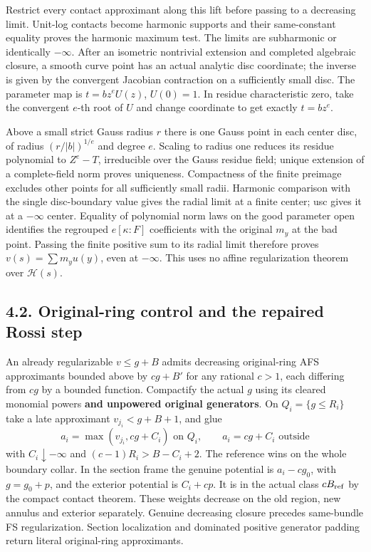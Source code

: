 \documentclass[
  10pt,
]{article}
\begin{document}
Restrict every contact approximant along this lift before passing to a
decreasing limit. Unit-log contacts become harmonic supports and their
same-constant equality proves the harmonic maximum test. The limits are
subharmonic or identically \(-\infty\). After an isometric nontrivial
extension and completed algebraic closure, a smooth curve point has an
actual analytic disc coordinate; the inverse is given by the convergent
Jacobian contraction on a sufficiently small disc. The parameter map is
\(t=bz^eU(z)\), \(U(0)=1\). In residue characteristic zero, take the
convergent \(e\)-th root of \(U\) and change coordinate to get exactly
\(t=bz^e\).

Above a small strict Gauss radius \(r\) there is one Gauss point in each
center disc, of radius \((r/|b|)^{1/e}\) and degree \(e\). Scaling to
radius one reduces its residue polynomial to \(Z^e-T\), irreducible over
the Gauss residue field; unique extension of a complete-field norm
proves uniqueness. Compactness of the finite preimage excludes other
points for all sufficiently small radii. Harmonic comparison with the
single disc-boundary value gives the radial limit at a finite center;
usc gives it at a \(-\infty\) center. Equality of polynomial norm laws
on the good parameter open identifies the regrouped \(e[\kappa:F]\)
coefficients with the original \(m_y\) at the bad point. Passing the
finite positive sum to its radial limit therefore proves
\(v(s)=\sum m_yu(y)\), even at \(-\infty\). This uses no affine
regularization theorem over \(\mathcal H(s)\).

\subsection{4.2. Original-ring control and the repaired Rossi
step}\label{original-ring-control-and-the-repaired-rossi-step}

An already regularizable \(v\le g+B\) admits decreasing original-ring
AFS approximants bounded above by \(cg+B'\) for any rational \(c>1\),
each differing from \(cg\) by a bounded function. Compactify the actual
\(g\) using its cleared monomial powers \textbf{and unpowered original
generators}. On \(Q_i=\{g\le R_i\}\) take a late approximant
\(v_{j_i}<g+B+1\), and glue
\[a_i=\max(v_{j_i},cg+C_i)\text{ on }Q_i,\qquad a_i=cg+C_i\text{ outside}\]
with \(C_i\downarrow-\infty\) and \((c-1)R_i>B-C_i+2\). The reference
wins on the whole boundary collar. In the section frame the genuine
potential is \(a_i-cg_0\), with \(g=g_0+p\), and the exterior potential
is \(C_i+cp\). It is in the actual class \(cB_{\rm ref}\) by the compact
contact theorem. These weights decrease on the old region, new annulus
and exterior separately. Genuine decreasing closure precedes same-bundle
FS regularization. Section localization and dominated positive generator
padding return literal original-ring approximants.
\end{document}
